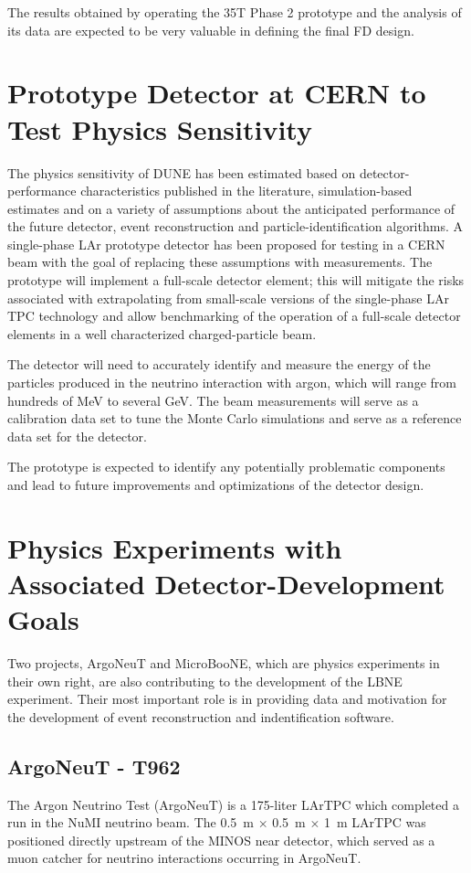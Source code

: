The results obtained by operating the 35T Phase 2 prototype and the analysis of its data are expected
to be very valuable in defining the final FD design. 

\section{Prototype Detector at CERN to Test Physics Sensitivity}

The physics sensitivity of DUNE has been estimated based on detector-performance characteristics published in the literature, simulation-based estimates
and on a variety of assumptions about the anticipated performance of the future detector, event reconstruction and particle-identification algorithms.
A single-phase LAr prototype detector has been proposed for testing in a CERN beam with the goal of
 replacing these assumptions with measurements.  The prototype will implement a full-scale detector element; this will 
 mitigate the risks associated with extrapolating from small-scale versions of the single-phase LAr TPC technology and allow benchmarking of the operation of a full-scale detector elements in a well characterized charged-particle beam.  

The detector will need to accurately identify and measure the energy of the particles produced in the neutrino interaction with argon, which will range from hundreds of MeV to several GeV.
The beam measurements will serve as a calibration data set to tune the Monte Carlo simulations and serve as a reference data set for the detector. 

The prototype is expected to identify any potentially problematic components and lead to future improvements and optimizations of the detector design.


\section{Physics Experiments with Associated Detector-Development Goals}

Two projects, ArgoNeuT and MicroBooNE,  which are physics experiments in their own right, are also contributing to the development of the LBNE experiment. Their most important role is in providing data and motivation for the development of event reconstruction and indentification software.

\subsection{ArgoNeuT - T962}
The Argon Neutrino Test (ArgoNeuT) is a 175-liter LArTPC which completed a run in the NuMI neutrino beam.  The 0.5~m $\times$ 0.5~m $\times$ 1~m LArTPC was positioned directly upstream of the MINOS near detector, which served as a muon catcher for neutrino interactions occurring in ArgoNeuT. 

